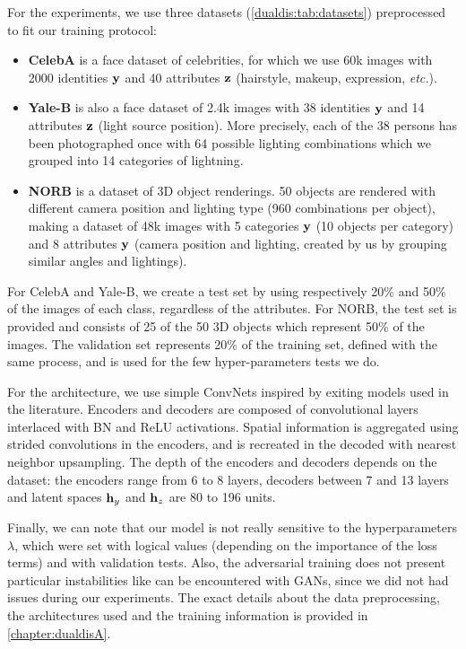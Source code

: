 For the experiments, we use three datasets (\cf \autoref{dualdis:tab:datasets}) preprocessed to fit our training protocol:
\begin{itemize}
    \item \textbf{CelebA} \citep{celeba} is a face dataset of celebrities, for which we use 60k images with 2000 identities $\mathbf{y}$ and 40 attributes $\mathbf{z}$ (hairstyle, makeup, expression, \textit{etc.}).
    \item \textbf{Yale-B} \citep{yale} is also a face dataset of 2.4k images with 38 identities $\mathbf{y}$ and 14 attributes $\mathbf{z}$ (light source position). More precisely, each of the 38 persons has been photographed once with 64 possible lighting combinations which we grouped into 14 categories of lightning.
    \item \textbf{NORB} \citep{norb} is a dataset of 3D object renderings. 50 objects are rendered with different camera position and lighting type (960 combinations per object), making a dataset of 48k images with 5 categories $\mathbf{y}$ (10 objects per category) and 8 attributes $\mathbf{y}$ (camera position and lighting, created by us by grouping similar angles and lightings).
\end{itemize}

For CelebA and Yale-B, we create a test set by using respectively 20\% and 50\% of the images of each class, regardless of the attributes. For NORB, the test set is provided and consists of 25 of the 50 3D objects which represent 50\% of the images. The validation set represents 20\% of the training set, defined with the same process, and is used for the few hyper-parameters tests we do.

For the architecture, we use simple \acp{ConvNet} inspired by exiting models used in the literature. Encoders and decoders are composed of convolutional layers interlaced with \ac{BN} and \acs{ReLU} activations. Spatial information is aggregated using strided convolutions in the encoders, and is recreated in the decoded with nearest neighbor upsampling. The depth of the encoders and decoders depends on the dataset: the encoders range from 6 to 8 layers, decoders between 7 and 13 layers and latent spaces $\mathbf{h}_y$ and $\mathbf{h}_z$ are 80 to 196 units.

Finally, we can note that our model is not really sensitive to the hyperparameters $\lambda$, which were set with logical values (depending on the importance of the loss terms) and with validation tests. Also, the adversarial training does not present particular instabilities like can be encountered with \acp{GAN}, since we did not had issues during our experiments. The exact details about the data preprocessing, the architectures used and the training information is provided in \autoref{chapter:dualdisA}. 



